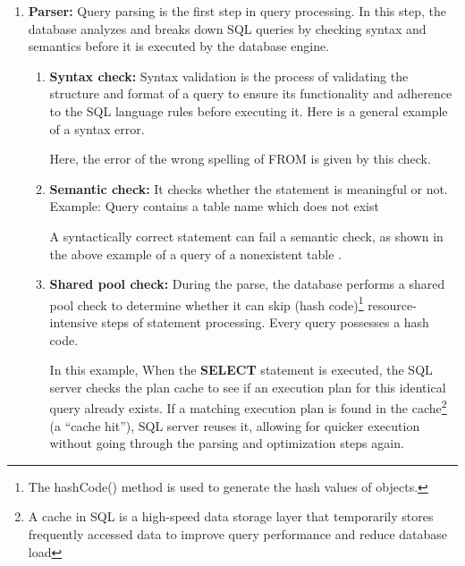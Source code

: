 \begin{enumerate}
\item \textbf{Parser:} Query parsing is the first step in query processing. In this step, the database analyzes and breaks down SQL queries by checking syntax and semantics before it is executed by the database engine\cite{wwwnaukricom-no-date}.

    \begin{enumerate}
        \item \textbf{Syntax check:} Syntax validation is the process of validating the structure and format of a query to ensure its functionality and adherence to the SQL language rules before executing it. Here is a general example of a syntax error.
        
        
          Here, the error of the wrong spelling of FROM is given by this check.\vspace{.4cm}
          
        \item \textbf{Semantic check:} It checks whether the statement is meaningful or not. Example: Query contains a table name which does not exist
        
        
        
        A syntactically correct statement can fail a semantic check, as shown in the above example of a query of a nonexistent table \cite{Oracle}.\vspace{.4cm}
        
        \item \textbf{Shared pool check:} During the parse, the database performs a shared pool check to determine whether it can skip (hash code)\footnote{The hashCode() method is used to generate the hash values of objects.} resource-intensive steps of statement processing. Every query possesses a hash code.\vspace{.4cm}
        
        
        
        In this example, When the \textbf{SELECT} statement is executed, the SQL server checks the plan cache to see if an execution plan for this identical query already exists. If a matching execution plan is found in the cache\footnote{A cache in SQL is a high-speed data storage layer that temporarily stores frequently accessed data to improve query performance and reduce database load} (a ``cache hit''), SQL server reuses it, allowing for quicker execution without going through the parsing and optimization steps again.
        

\end{enumerate}
\end{enumerate}
